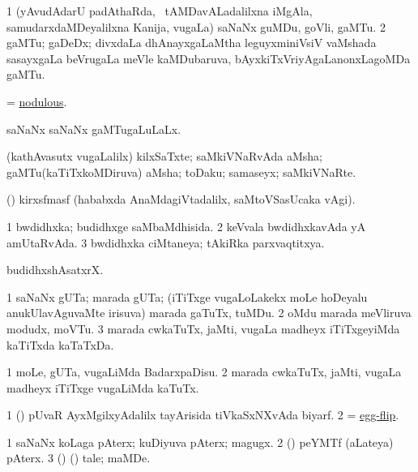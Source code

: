 \bentry
{}
\gl{\nA}
\bmng
\bnum
\num{1} (yAvudAdarU padAthaRda, \udA\ tAMDavALadalilxna iMgAla, samudarxdaMDeyalilxna Kanija, \mo vugaLa) saNaNx guMDu, goVli, gaMTu. 
\num{2} gaMTu; gaDeDx; divxdaLa dhAnayxgaLaMtha leguyxminiVsiV vaMshada sasayxgaLa beVrugaLa meVle kaMDubaruva, bAyxkiTxVriyAgaLanonxLagoMDa gaMTu. 
\enum
\emng
\eentry

\bentry
{}
\gl{\gu}
\bmng
= \hyperlink{nodulous}{nodulous}. 
\emng
\eentry

\bentry
{}
\gl{\gu}
\bmng
saNaNx saNaNx gaMTugaLuLaLx. 
\emng
\eentry

\bentry
{}
\gl{\nA}
\bmng
(kathAvasutx \mo vugaLalilx) kilxSaTxte; saMkiVNaRvAda aMsha; gaMTu(kaTiTxkoMDiruva) aMsha; toDaku; samaseyx; saMkiVNaRte. 
\emng
\eentry

\bentry
{}
\gl{\nA}
\bmng
(\kanmu) kirxsfmasf (hababxda AnaMdagiVtadalilx, saMtoVSasUcaka \BAavayx vAgi). 
\emng
\eentry

\bentry
{}
\gl{\gu}
\bmng
\bnum
\num{1} bwdidhxka; budidhxge saMbaMdhisida. 
\num{2} keVvala bwdidhxkavAda yA amUtaRvAda. 
\num{3} bwdidhxka ciMtaneya; tAkiRka parxvaqtitxya. 
\enum
\emng
\eentry

\bentry
{}
\gl{\nA}
\bmng
budidhxshAsatxrX. 
\emng
\eentry

\bentry
{}
\gl{\nA}
\bmng
\bnum
\num{1} saNaNx gUTa; marada gUTa; (iTiTxge \mo vugaLoLakekx moLe hoDeyalu anukUlavAguvaMte irisuva) marada gaTuTx, tuMDu. 
\num{2} oMdu marada meVliruva modudx, moVTu. 
\num{3} marada cwkaTuTx, jaMti, \mo vugaLa madheyx iTiTxgeyiMda kaTiTxda kaTaTxDa. 
\enum
\emng
\eentry

\bentry
{}
\gl{\sakirx}
\bmng
\bnum
\num{1} moLe, gUTa, \mo vugaLiMda BadarxpaDisu. 
\num{2} marada cwkaTuTx, jaMti, \mo vugaLa madheyx iTiTxge \mo vugaLiMda kaTuTx. 
\enum
\emng
\eentry

\bentry
{}
\gl{\nA}
\bmng
\bnum
\num{1} (\birx) pUvaR AyxMgilxyAdalilx tayArisida tiVkaSxNXvAda biyarf. 
\num{2} = \hyperref{kandict_e.pdf}{E}{egg-flip}{egg-flip}. 
\enum
\emng
\eentry

\bentry
{}
\gl{\nA}
\bmng
\bnum
\num{1} saNaNx koLaga pAterx; kuDiyuva pAterx; magugx. 
\num{2} (\sA) \eng{$\frac\bg 1\eg /\bg 4\eg$} peYMTf (aLateya) pAterx. 
\num{3} (\ame) (\ashi) tale; maMDe. 
\enum
\emng
\eentry

